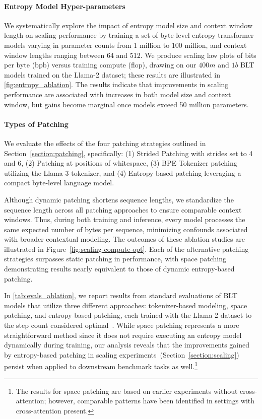 \paragraph{Entropy Model Hyper-parameters} We systematically explore the impact of entropy model size and context window length on scaling performance by training a set of byte-level entropy transformer models varying in parameter counts from 1 million to 100 million, and context window lengths ranging between 64 and 512. We produce scaling law plots of bits per byte (bpb) versus training compute (flop), drawing on our $400m$ and $1b$ {\textsc BLT} models trained on the Llama-2 dataset; these results are illustrated in \autoref{fig:entropy_ablation}. The results indicate that improvements in scaling performance are associated with increases in both model size and context window, but gains become marginal once models exceed 50 million parameters.

\paragraph{Types of Patching}

We evaluate the effects of the four patching strategies outlined in Section~\ref{section:patching}, specifically: (1) Strided Patching with strides set to 4 and 6, (2) Patching at positions of whitespace, (3) BPE Tokenizer patching utilizing the Llama 3 tokenizer, and (4) Entropy-based patching leveraging a compact byte-level language model.

Although dynamic patching shortens sequence lengths, we standardize the sequence length across all patching approaches to ensure comparable context windows. Thus, during both training and inference, every model processes the same expected number of bytes per sequence, minimizing confounds associated with broader contextual modeling. The outcomes of these ablation studies are illustrated in Figure~\ref{fig:scaling-compute-opt}. Each of the alternative patching strategies surpasses static patching in performance, with space patching demonstrating results nearly equivalent to those of dynamic entropy-based patching.

In \autoref{tab:evals_ablation}, we report results from standard evaluations of {\textsc BLT} models that utilize three different approaches: tokenizer-based modeling, space patching, and entropy-based patching, each trained with the Llama 2 dataset to the step count considered optimal~\citep{dubey2024llama}. While space patching represents a more straightforward method since it does not require executing an entropy model dynamically during training, our analysis reveals that the improvements gained by entropy-based patching in scaling experiments~(Section~\ref{section:scaling}) persist when applied to downstream benchmark tasks as well.\footnote{The results for space patching are based on earlier experiments without cross-attention; however, comparable patterns have been identified in settings with cross-attention present.}

